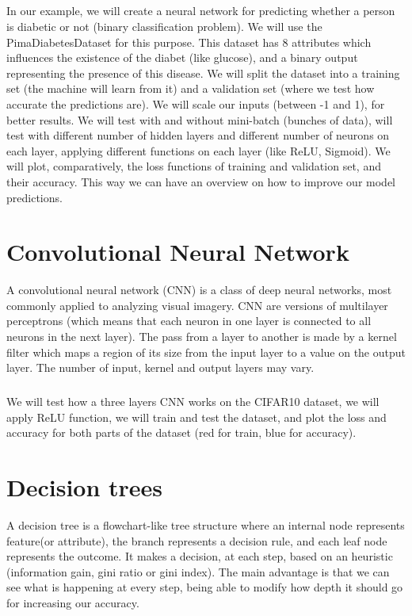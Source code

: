 \documentclass[a4paper,12pt]{report}
\begin{document}
\paragraph{}
In our example, we will create a neural network for predicting whether a person is diabetic or not (binary classification problem). We will use the PimaDiabetesDataset for this purpose. This dataset has 8 attributes which influences the existence of the diabet (like glucose), and a binary output representing the presence of this disease. We will split the dataset into a training set (the machine will learn from it) and a validation set (where we test how accurate the predictions are). We will scale our inputs (between -1 and 1), for better results. We will test with and without mini-batch (bunches of data), will test with different number of hidden layers and different number of neurons on each layer, applying different functions on each layer (like ReLU, Sigmoid). We will plot, comparatively, the loss functions of training and validation set, and their accuracy. This way we can have an overview on how to improve our model predictions.

{\let\clearpage\relax \chapter{Convolutional Neural Network}}
A convolutional neural network (CNN) is a class of deep neural networks, most commonly applied to analyzing visual imagery. CNN are versions of multilayer perceptrons (which means that each neuron in one layer is connected to all neurons in the next layer). The pass from a layer to another is made by a kernel filter which maps a region of its size from the input layer to a value on the output layer. The number of input, kernel and output layers may vary.
\paragraph{}
We will test how a three layers CNN works on the CIFAR10 dataset, we will apply ReLU function, we will train and test the dataset, and plot the loss and accuracy for both parts of the dataset (red for train, blue for accuracy).

{\let\clearpage\relax \chapter{Decision trees}}
A decision tree is a flowchart-like tree structure where an internal node represents feature(or attribute), the branch represents a decision rule, and each leaf node represents the outcome. It makes a decision, at each step, based on an heuristic (information gain, gini ratio or gini index). The main advantage is that we can see what is happening at every step, being able to modify how depth it should go for increasing our accuracy.
\end{document}
